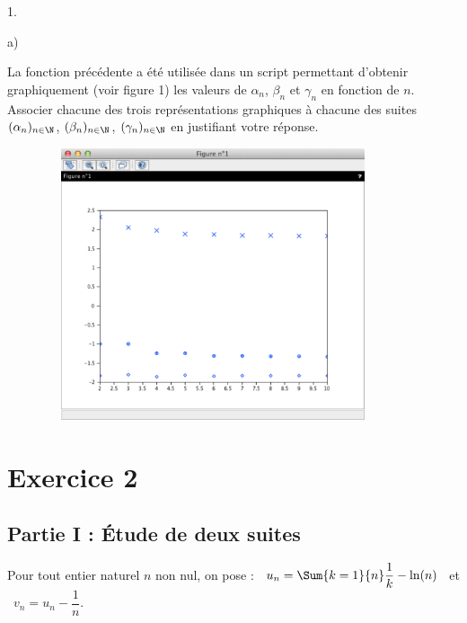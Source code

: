 \begin{noliste}{1.}
\begin{noliste}{a)}
  \item La fonction précédente a été utilisée dans un script
    permettant d'obtenir graphiquement (voir figure 1) les valeurs de
    $\alpha_{n}$, $\beta_{n}$ et $\gamma_{n}$ en fonction de $n$.\\
    Associer chacune des trois représentations graphiques à chacune
    des suites $(\alpha_{n})_{n\in \N}$, $(\beta_{n})_{n\in \N}$,
    $(\gamma_{n})_{n\in \N}$ en justifiant votre réponse.
    \begin{figure}[!h]
      \centering
      \includegraphics[width=10cm,
      height=8cm]{Figures/ECRICOME_2018/suites_alpha_beta_gamma.pdf}  
    \end{figure}
    
  \end{noliste}
\end{noliste}


\newpage


\section*{Exercice 2}

\subsection*{Partie I : Étude de deux suites}

\noindent
Pour tout entier naturel $n$ non nul, on pose : \ $u_{n} = \Sum{k =
  1}{n} \dfrac{1}{k} - \ln(n)$ \ et \ $v_{n} = u_{n} - \dfrac{1}{n}$.

